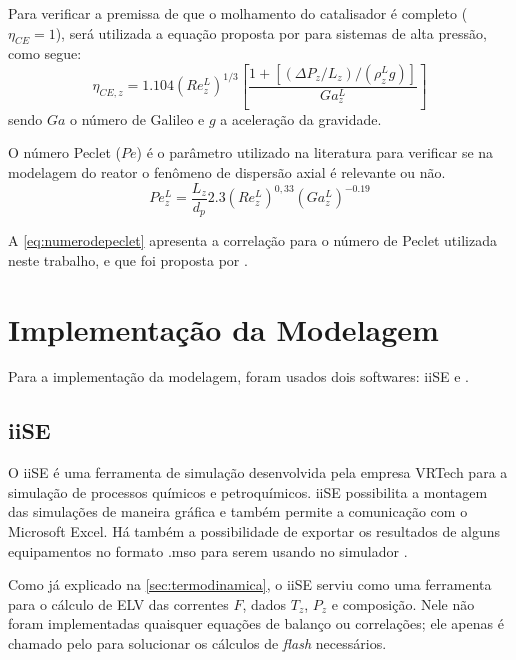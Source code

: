 
Para verificar a premissa de que o molhamento do catalisador é completo
($\eta_{CE} = 1$), será utilizada a equação proposta por
 para sistemas de alta pressão, como segue:
\begin{equation}
\eta_{CE,z} = 1.104(Re_z^L)^{1/3} \left [
\dfrac{1 + [(\Delta P_z/L_{z})/(\rho_{z}^L g)]}{Ga_{z}^{L}} \right ]
\label{eq:molhamento}
\end{equation}
sendo $Ga$ o número de Galileo e $g$ a aceleração da gravidade.


O número Peclet ($Pe$) é o parâmetro utilizado na literatura para verificar
se na modelagem do reator o fenômeno de dispersão axial é relevante ou não.
\begin{equation}
Pe_z^L = \dfrac{L_z}{d_p} 2.3(Re_z^L)^{0,33}(Ga_{z}^{L})^{-0.19}
\label{eq:numerodepeclet}
\end{equation}

A \autoref{eq:numerodepeclet} apresenta a correlação para o número de
Peclet utilizada neste trabalho, e que foi proposta por
.


\section{Implementação da Modelagem} \label{sec:implementacao}

Para a implementação da modelagem, foram usados dois softwares: iiSE e \emso. 

\subsection{iiSE} \label{sec:iise}

O iiSE é uma ferramenta de simulação desenvolvida pela empresa VRTech para a
simulação de processos químicos e petroquímicos. iiSE possibilita a
montagem das simulações de maneira gráfica e também permite a comunicação
com o Microsoft Excel. Há também a possibilidade de exportar os resultados
de alguns equipamentos no formato .mso para serem usando no simulador \emso.

Como já explicado na \autoref{sec:termodinamica}, o iiSE serviu como uma
ferramenta para o cálculo de ELV das correntes $F$, dados $T_z$, $P_z$ e
composição. Nele não foram implementadas quaisquer equações de balanço ou
correlações; ele apenas é chamado pelo \emso para solucionar os cálculos de
\emph{flash} necessários.

